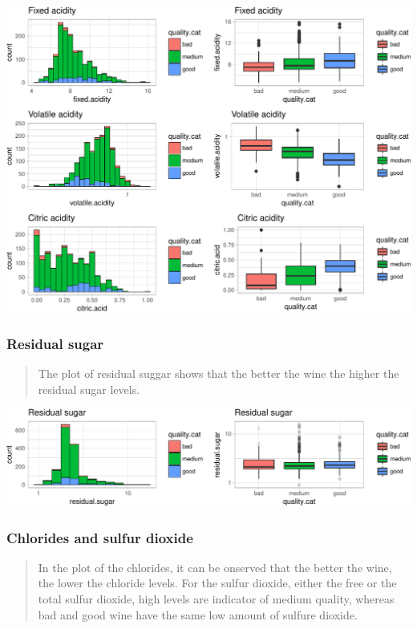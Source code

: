 \documentclass[]{article}
\begin{document}
\includegraphics{Figs/Bivariate_Plots_acidity-1.pdf}

\subsubsection{Residual sugar}\label{residual-sugar-1}

\begin{quote}
The plot of residual suggar shows that the better the wine the higher
the residual sugar levels.
\end{quote}

\includegraphics{Figs/Bivariate_Plots_residual_sugar-1.pdf}

\subsubsection{Chlorides and sulfur
dioxide}\label{chlorides-and-sulfur-dioxide-1}

\begin{quote}
In the plot of the chlorides, it can be onserved that the better the
wine, the lower the chloride levels. For the sulfur dioxide, either the
free or the total sulfur dioxide, high levels are indicator of medium
quality, whereas bad and good wine have the same low amount of sulfure
dioxide.
\end{quote}
\end{document}
